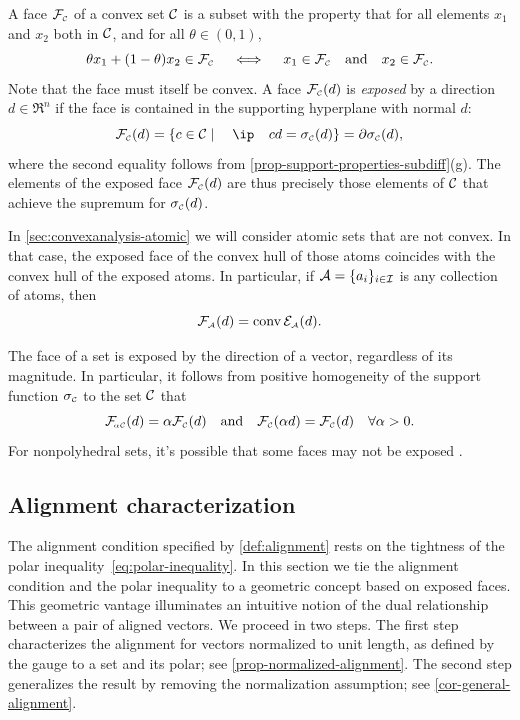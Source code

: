 A face $\mathcal{F}_{\scriptscriptstyle\mathcal{C}}$ of a convex set $\mathcal{C}$ is a subset with the property that for
all elements $x_1$ and $x_2$ both in $\mathcal{C}$, and for all $\theta\in (0,1)$,
\[
  \theta x_1 + (1-\theta) x_2\in \mathcal{F}_{\scriptscriptstyle\mathcal{C}} \quad \iff\quad x_1\in \mathcal{F}_{\scriptscriptstyle\mathcal{C}}
  \hbox{\quad and\quad} x_2\in \mathcal{F}_{\scriptscriptstyle\mathcal{C}}.
\]
Note that the face must itself be convex. A face $\mathcal{F}_{\scriptscriptstyle\mathcal{C}}(d)$ is
\emph{exposed} by a direction $d\in\Re^n$ if the face is contained in the
supporting hyperplane with normal $d$:
\begin{equation} \label{eq:face} 
  \Fscr\Cs(d) = \{c\in\Cscr \mid \ip c d =
    \sigma\Cs(d)\} =\partial\sigma\Cs(d),
\end{equation}
where the second equality follows from \autoref{prop-support-properties-subdiff}(g).
The elements of the exposed face $\mathcal{F}_{\scriptscriptstyle\mathcal{C}}(d)$ are thus precisely those elements
of $\mathcal{C}$ that achieve the supremum for $\sigma_{\scriptscriptstyle\mathcal{C}}(d)$.

In \autoref{sec:convexanalysis-atomic} we will consider atomic sets that are not
convex. In that case, the exposed face of the convex hull of those atoms
coincides with the convex hull of the exposed atoms. In particular, if
$\mathcal{A}=\{a_i\}_{i\in\mathcal{I}}$ is any collection of atoms, then
\[
  \mathcal{F}_{\scriptscriptstyle\mathcal{A}}(d) = \operatorname{conv}\mathcal{E}_{\scriptscriptstyle\mathcal{A}}(d).
\]

The face of a set is exposed by the direction of a vector, regardless of its
magnitude. In particular, it follows from positive homogeneity of the support
function $\sigma_{\scriptscriptstyle\mathcal{C}}$ to the set $\mathcal{C}$ that
\begin{equation}\label{eq:11}
  \mathcal{F}_{\scriptscriptstyle\!\alpha\mathcal{C}}(d)=\alpha\mathcal{F}_{\scriptscriptstyle\mathcal{C}}(d)
  \hbox{\quad and\quad}
  \mathcal{F}_{\scriptscriptstyle\mathcal{C}}(\alpha d)=\mathcal{F}_{\scriptscriptstyle\mathcal{C}}(d) \quad \forall \alpha>0.
\end{equation}
For nonpolyhedral sets, it's possible that some faces may not be exposed
\cite[p.~163]{rockafellar1970convex}.

\subsection{Alignment characterization}

The alignment condition specified by \autoref{def:alignment} rests on the tightness
of the polar inequality~\eqref{eq:polar-inequality}. In this section we tie the
alignment condition and the polar inequality to a geometric concept based on
exposed faces. This geometric vantage illuminates an intuitive notion of the
dual relationship between a pair of aligned vectors. We proceed in two steps.
The first step characterizes the alignment for vectors normalized to
unit length, as defined by the gauge to a set and its polar; see
\autoref{prop-normalized-alignment}. The second step generalizes the result by
removing the normalization assumption; see \autoref{cor-general-alignment}.

